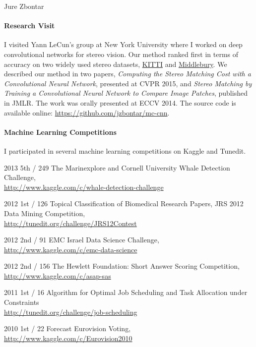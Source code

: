 \documentclass[12pt,a4paper]{article}
\begin{document}
\begin{cv}{Jure Zbontar}
\begin{cvlist}{}
\end{cvlist}

\paragraph{Research Visit}
I visited Yann LeCun's group at New York University where I worked on deep
convolutional networks for stereo vision. Our method ranked first in terms of
accuracy on two widely used stereo datasets,
\href{http://www.cvlibs.net/datasets/kitti/eval_stereo.php}{KITTI} and
\href{http://vision.middlebury.edu/stereo/eval3/}{Middlebury}. We described our
method in two papers, \textit{Computing the Stereo Matching Cost with a
Convolutional Neural Network}, presented at CVPR 2015, and \textit{Stereo
Matching by Training a Convolutional Neural Network to Compare Image Patches},
published in JMLR. The work was orally presented at ECCV 2014. The source code
is available online: \url{https://github.com/jzbontar/mc-cnn}.

\paragraph{Machine Learning Competitions}
I participated in several machine learning competitions on Kaggle and Tunedit.

\begin{cvlist}{}
\item[2013 \quad 5th / 249] The Marinexplore and Cornell University Whale Detection 
Challenge, \\
\url{http://www.kaggle.com/c/whale-detection-challenge}
\item[2012 \quad 1st / 126] Topical Classification of Biomedical Research Papers, 
JRS 2012 Data Mining Competition, \\
\url{http://tunedit.org/challenge/JRS12Contest}
\item[2012 \quad 2nd / 91] EMC Israel Data Science Challenge, \\
\url{http://www.kaggle.com/c/emc-data-science}
\item[2012 \quad 2nd / 156] The Hewlett Foundation: Short Answer Scoring 
Competition, \\
\url{http://www.kaggle.com/c/asap-sas}
\item[2011 \quad 1st / 16] Algorithm for Optimal Job Scheduling and Task 
Allocation under Constraints \\
\url{http://tunedit.org/challenge/job-scheduling}
\item[2010 \quad 1st / 22] Forecast Eurovision Voting, \\
\url{http://www.kaggle.com/c/Eurovision2010}
\end{cvlist}


\end{cv}
\end{document}

